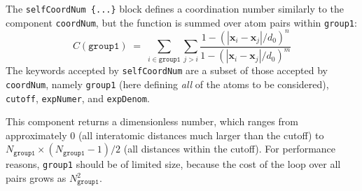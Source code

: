 
The \texttt{selfCoordNum \{...\}} block defines
a coordination number similarly to the component \texttt{coordNum},
but the function is summed over atom pairs within \texttt{group1}:
\begin{equation}
  \label{eq:cvc_selfCoordNum}
  C (\mathtt{group1}) \; = \;
  \sum_{i\in\mathtt{group1}}\sum_{j > i} {
    \frac{1 - (|\mathbf{x}_{i}-\mathbf{x}_{j}|/d_{0})^{n}}{
      1 - (|\mathbf{x}_{i}-\mathbf{x}_{j}|/d_{0})^{m} }
  }
\end{equation}
The keywords accepted by \texttt{selfCoordNum} are a subset of
those accepted by \texttt{coordNum}, namely \texttt{group1}
(here defining \emph{all} of the atoms to be considered),
\texttt{cutoff}, \texttt{expNumer}, and \texttt{expDenom}.

\begin{cvcoptions}
\item %
\item %
\item %
\item %
\item %
\item %
\item %
\end{cvcoptions}

This component returns a dimensionless number, which ranges from
approximately 0 (all interatomic distances much larger than the
cutoff) to $N_{\mathtt{group1}} \times (N_{\mathtt{group1}} - 1) / 2$ (all
distances within the cutoff).  For performance reasons,
\texttt{group1} should be of limited size, because the cost of the
loop over all pairs grows as $N_{\mathtt{group1}}^2$.



